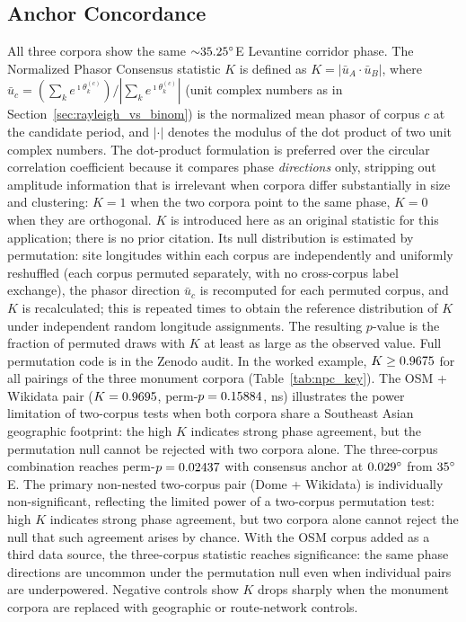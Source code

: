 \documentclass[12pt,a4paper]{article}
\newcommand{\degr}{\ifmmode^\circ\else\textdegree{}\fi}
\begin{document}
\subsection{Anchor Concordance}
\label{sec:anchor_concordance}

All three corpora show the same ${\sim}35.25\degr$E Levantine
corridor phase. The Normalized Phasor Consensus statistic $K$ is
defined as $K = |\bar{u}_A \cdot \bar{u}_B|$, where $\bar{u}_c =
(\sum_k e^{\imath\theta_k^{(c)}})/|\sum_k e^{\imath\theta_k^{(c)}}|$
(unit complex numbers as in Section~\ref{sec:rayleigh_vs_binom}) is the
normalized mean phasor of corpus $c$ at the candidate period, and
$|\cdot|$ denotes the modulus of the dot product of two unit complex
numbers. The dot-product formulation is
preferred over the circular correlation coefficient
\citep[§8.3]{mardiajupp2000} because it compares phase
\emph{directions} only, stripping out amplitude information that is
irrelevant when corpora differ substantially in size and clustering:
$K = 1$ when the two corpora point to the same phase, $K = 0$ when
they are orthogonal. $K$ is introduced here as an original statistic
for this application; there is no prior citation. Its null distribution
is estimated by permutation: site longitudes within each corpus are
independently and uniformly reshuffled (each corpus permuted separately,
with no cross-corpus label exchange), the phasor direction $\bar{u}_c$
is recomputed for each permuted corpus, and $K$ is recalculated;
this is repeated \simNperms{} times to obtain the reference distribution
of $K$ under independent random longitude assignments. The resulting
$p$-value is the fraction of permuted draws with $K$ at least as large
as the observed value. Full permutation code is in the Zenodo audit.
In the worked example,
$K \geq 0.9675{}$ for all pairings of the three monument
corpora (Table~\ref{tab:npc_key}). The OSM + Wikidata pair
($K = 0.9695{}$, perm-$p = 0.15884{}$, ns) illustrates
the power limitation of two-corpus tests when both corpora share a
Southeast Asian geographic footprint: the high $K$ indicates strong phase
agreement, but the permutation null cannot be rejected with two corpora alone.
The three-corpus combination reaches
perm-$p = 0.02437{}$ with consensus anchor at
$\npcOsmThreeGridDeltaE\degr$ from $35\degr$E. The primary non-nested
two-corpus pair (Dome + Wikidata) is individually non-significant,
reflecting the limited power of a two-corpus permutation test: high $K$
indicates strong phase agreement, but two corpora alone cannot reject the
null that such agreement arises by chance. With the OSM corpus added as
a third data source, the three-corpus statistic reaches significance:
the same phase directions are uncommon under the permutation null even
when individual pairs are underpowered. Negative controls show
$K$ drops sharply when the monument corpora are replaced with
geographic or route-network controls.
\end{document}
